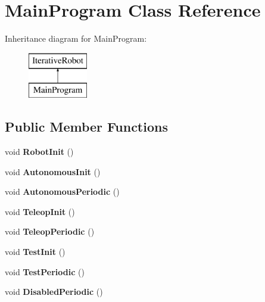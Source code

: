 \hypertarget{class_main_program}{}\section{Main\+Program Class Reference}
\label{class_main_program}
Inheritance diagram for Main\+Program\+:\begin{figure}[H]
\begin{center}
\leavevmode
\includegraphics[height=2.000000cm]{class_main_program}
\end{center}
\end{figure}
\subsection*{Public Member Functions}
\begin{DoxyCompactItemize}
\item 
\mbox{\label{class_main_program_a7e874801d13eddebc3d6abb0bddcd741}} 
void {\bfseries Robot\+Init} ()
\item 
\mbox{\label{class_main_program_a0e4b90779d59d7d37534514a7f53e70d}} 
void {\bfseries Autonomous\+Init} ()
\item 
\mbox{\label{class_main_program_a203b4b5345da0064b1131be9e769ce44}} 
void {\bfseries Autonomous\+Periodic} ()
\item 
\mbox{\label{class_main_program_a7c27fa2f63d0289ec779ca2d8cf17db7}} 
void {\bfseries Teleop\+Init} ()
\item 
\mbox{\label{class_main_program_a9ad6dd3b0af4928522a2f51f93a502ab}} 
void {\bfseries Teleop\+Periodic} ()
\item 
\mbox{\label{class_main_program_a6cc3d4d9df4c41a2c0d69338d7a232a8}} 
void {\bfseries Test\+Init} ()
\item 
\mbox{\label{class_main_program_ae39fe132e153d724c9b0991e5c8b72ea}} 
void {\bfseries Test\+Periodic} ()
\item 
\mbox{\label{class_main_program_a7c4b79b2c1aad1f5391bc93eb183c007}} 
void {\bfseries Disabled\+Periodic} ()
\end{DoxyCompactItemize}
